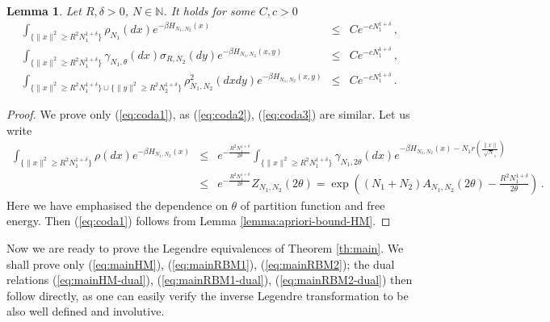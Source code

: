 \documentclass[10pt,oneside,a4paper,reqno]{amsart}  %
\def\bea{\begin{eqnarray}}
\def\eea{\end{eqnarray}}
\def\nn{\nonumber}
\def\d{\delta}
\def\g{\gamma}
\def\b{\beta}
\def\r{\rho}
\def\s{\sigma}
\def\N{\mathbb{N}}
\theoremstyle{plain}
\newtheorem{lemma}[theorem]{Lemma}
\numberwithin{equation}{section}
\begin{document}
\begin{lemma}\label{lemma:coda}
Let $R,\d>0$, $N\in\N$. It holds for some $C,c>0$
\bea
\int_{\{\|x\|^2\geq R^2N_1^{1+\d}\}} \r_{N_1}(dx)e^{-\b H_{N_1,N_2}(x)}&\leq& C e^{-cN_1^{1+\d}}\,,\label{eq:coda1}\\
\int_{\{\|x\|^2\geq R^2N_1^{1+\d}\}} \g_{N_1,\theta}(dx)\s_{R,N_2}(dy)e^{-\b H_{N_1,N_2}(x,y)}&\leq& C e^{-cN_1^{1+\d}}\,,\label{eq:coda2}\\
\int_{\{\|x\|^2\geq R^2N_1^{1+\d}\}\cup \{\|y\|^2\geq R^2N_2^{1+\d}\}} \r_{N_1,N_2}^2(dxdy)e^{-\b H_{N_1,N_2}(x,y)}&\leq& C e^{-cN_1^{1+\d}}\label{eq:coda3}\,.
\eea 
\end{lemma}
\begin{proof}
We prove only (\ref{eq:coda1}), as (\ref{eq:coda2}), (\ref{eq:coda3}) are similar. Let us write
\bea
\int_{\{\|x\|^2\geq R^2N_1^{1+\d}\}} \r(dx)e^{-\b H_{N_1,N_2}(x)}&\leq& e^{-\frac{R^2N_1^{1+\d}}{2\theta}}\int_{\{\|x\|^2\geq R^2N_1^{1+\d}\}} \g_{N_1,2\theta}(dx)e^{-\b H_{N_1,N_2}(x)-N_1r\left(\frac{\|x\|}{\sqrt N_1}\right)}\nn\\
&\leq&e^{-\frac{R^2N_1^{1+\d}}{2\theta}} Z_{N_1,N_2}(2\theta) =\exp\left( (N_1+N_2)A_{N_1,N_2}(2\theta)-\frac{R^2N_1^{1+\d}}{2\theta}\right)\,. \nn
\eea
Here we have emphasised the dependence on $\theta$ of partition function and free energy. Then (\ref{eq:coda1}) follows from Lemma \ref{lemma:apriori-bound-HM}.
\end{proof}


Now we are ready to prove the Legendre equivalences of Theorem \ref{th:main}. We shall prove only (\ref{eq:mainHM}), (\ref{eq:mainRBM1}), (\ref{eq:mainRBM2}); the dual relations (\ref{eq:mainHM-dual}), (\ref{eq:mainRBM1-dual}), (\ref{eq:mainRBM2-dual}) then follow directly, as one can easily verify the inverse Legendre transformation to be also well defined and involutive. 
\end{document}
